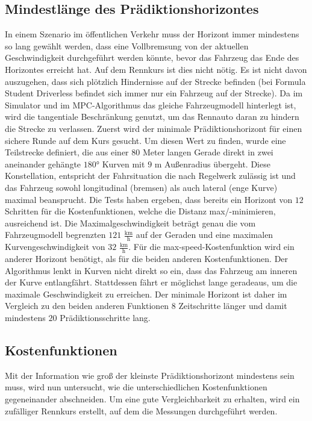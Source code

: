 \documentclass{like}
\begin{document}
\subsection{Mindestlänge des Prädiktionshorizontes} 
In einem Szenario im öffentlichen Verkehr muss der Horizont immer mindestens so lang gewählt werden, dass eine Vollbremsung von der aktuellen Geschwindigkeit durchgeführt werden könnte, bevor das Fahrzeug das Ende des Horizontes erreicht hat. Auf dem Rennkurs ist dies nicht nötig. Es ist nicht davon auszugehen, dass sich plötzlich Hindernisse auf der Strecke befinden (bei Formula Student Driverless befindet sich immer nur ein Fahrzeug auf der Strecke). Da im Simulator und im \ac{MPC}-Algorithmus das gleiche Fahrzeugmodell hinterlegt ist, wird die tangentiale Beschränkung genutzt, um das Rennauto daran zu hindern die Strecke zu verlassen.
Zuerst wird der minimale Prädiktionshorizont für einen sichere Runde auf dem Kurs gesucht. Um diesen Wert zu finden, wurde eine Teilstrecke definiert, die aus einer $80$ Meter langen Gerade direkt in zwei aneinander gehängte $180$° Kurven mit $9$ m Außenradius übergeht. Diese Konstellation, entspricht der Fahrsituation die nach Regelwerk zulässig ist und das Fahrzeug sowohl longitudinal (bremsen) als auch lateral (enge Kurve) maximal beansprucht. Die Tests haben ergeben, dass bereits ein Horizont von $12$ Schritten für die Kostenfunktionen, welche die Distanz max/-minimieren, ausreichend ist. Die Maximalgeschwindigkeit beträgt genau die vom Fahrzeugmodell begrenzten $121$ $\frac{\text{km}}{\text{h}}$ auf der Geraden und eine maximalen Kurvengeschwindigkeit von $32$ $\frac{\text{km}}{\text{h}}$. 
Für die max-speed-Kostenfunktion wird ein anderer Horizont benötigt, als für die beiden anderen Kostenfunktionen. Der Algorithmus lenkt in Kurven nicht direkt so ein, dass das Fahrzeug am inneren der Kurve entlangfährt. Stattdessen fährt er möglichst lange geradeaus, um die maximale Geschwindigkeit zu erreichen. Der minimale Horizont ist daher im Vergleich zu den beiden anderen Funktionen $8$ Zeitschritte länger und damit mindestens $20$ Prädiktionsschritte lang.


\subsection{Kostenfunktionen}
Mit der Information wie groß der kleinste Prädiktionshorizont mindestens sein muss, wird nun untersucht, wie die unterschiedlichen Kostenfunktionen gegeneinander abschneiden. Um eine gute Vergleichbarkeit zu erhalten, wird ein zufälliger Rennkurs erstellt, auf dem die Messungen durchgeführt werden. 
\end{document}
